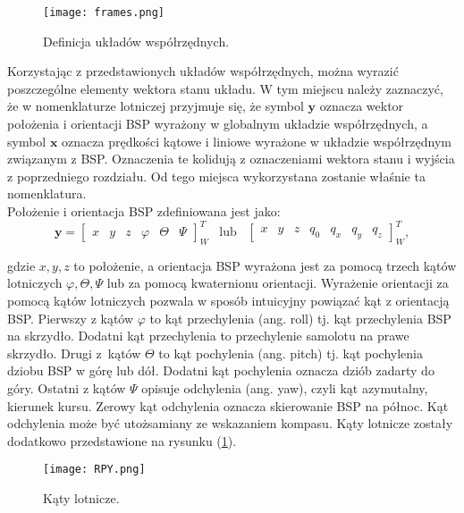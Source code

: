 \begin{figure}[!h]
   	\centering
      	\texttt{[image: frames.png]}
      	\caption{Definicja układów współrzędnych.}
\end{figure}

Korzystając z przedstawionych układów współrzędnych, można wyrazić poszczególne elementy wektora stanu układu. W tym miejscu należy zaznaczyć, że w nomenklaturze lotniczej przyjmuje się, że symbol $\bm{y}$ oznacza wektor położenia i orientacji BSP wyrażony w globalnym układzie współrzędnych, a symbol $\bm{x}$ oznacza prędkości kątowe i liniowe wyrażone w układzie współrzędnym związanym z BSP. Oznaczenia te kolidują z oznaczeniami wektora stanu i wyjścia z poprzedniego rozdziału. Od tego miejsca wykorzystana zostanie właśnie ta nomenklatura.\\

Położenie i orientacja BSP zdefiniowana jest jako:
\[
	      		 \bm{y} = \begin{bmatrix}x & y &  z & \varphi & \Theta & \Psi  \end{bmatrix}^{T}_{W} \hspace{10pt} \text{lub} \hspace{10pt} \begin{bmatrix}x & y & z & q_0 &  q_x &  q_y & q_z  \end{bmatrix}^{T}_{W},
\]

gdzie $x, y, z$ to położenie, a orientacja BSP wyrażona jest za pomocą trzech kątów lotniczych $\varphi, \Theta,  \Psi$ lub za pomocą kwaternionu orientacji. Wyrażenie orientacji za pomocą kątów lotniczych pozwala w sposób intuicyjny powiązać kąt z orientacją BSP. Pierwszy z kątów $\varphi$ to kąt przechylenia (ang. roll) tj. kąt przechylenia BSP na skrzydło. Dodatni kąt przechylenia to przechylenie samolotu na prawe skrzydło. Drugi z~kątów $\Theta$ to kąt pochylenia (ang. pitch) tj. kąt pochylenia dziobu BSP w górę lub dół. Dodatni kąt pochylenia oznacza dziób zadarty do góry. Ostatni z kątów $\Psi$ opisuje odchylenia (ang. yaw), czyli kąt azymutalny, kierunek kursu. Zerowy kąt odchylenia oznacza skierowanie BSP na północ. Kąt odchylenia może być utożsamiany ze wskazaniem kompasu. Kąty lotnicze zostały dodatkowo przedstawione na rysunku (\ref{RPY}).

\begin{figure}[!h]
   	\centering
      	\texttt{[image: RPY.png]}
      	\caption{Kąty lotnicze.}
      	\label{RPY}
\end{figure}

